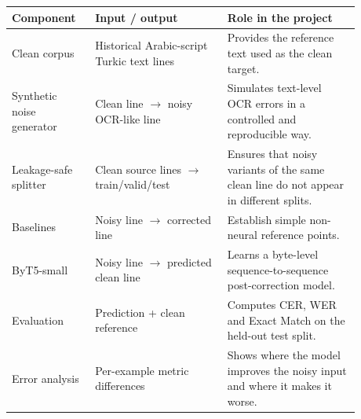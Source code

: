\begin{tabular}{p{0.20\linewidth}p{0.34\linewidth}p{0.34\linewidth}}
\toprule
Component & Input / output & Role in the project \\
\midrule
Clean corpus & Historical Arabic-script Turkic text lines & Provides the reference text used as the clean target. \\
Synthetic noise generator & Clean line $\rightarrow$ noisy OCR-like line & Simulates text-level OCR errors in a controlled and reproducible way. \\
Leakage-safe splitter & Clean source lines $\rightarrow$ train/valid/test & Ensures that noisy variants of the same clean line do not appear in different splits. \\
Baselines & Noisy line $\rightarrow$ corrected line & Establish simple non-neural reference points. \\
ByT5-small & Noisy line $\rightarrow$ predicted clean line & Learns a byte-level sequence-to-sequence post-correction model. \\
Evaluation & Prediction + clean reference & Computes CER, WER and Exact Match on the held-out test split. \\
Error analysis & Per-example metric differences & Shows where the model improves the noisy input and where it makes it worse. \\
\bottomrule
\end{tabular}

